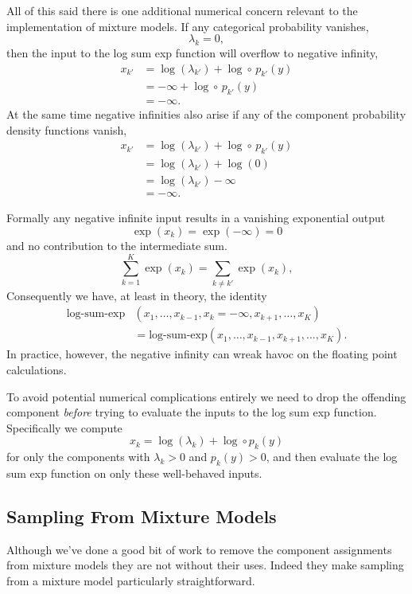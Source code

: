 \documentclass[
  letterpaper,
  DIV=11,
  numbers=noendperiod]{scrartcl}
\begin{document}
All of this said there is one additional numerical concern relevant to
the implementation of mixture models. If any categorical probability
vanishes, \[
\lambda_{k} = 0,
\] then the input to the log sum exp function will overflow to negative
infinity, \begin{align*}
x_{k'}
&=
\log(\lambda_{k'}) + \log \circ \, p_{k'}(y)
\\
&=
-\infty + \log \circ \, p_{k'}(y)
\\
&=
-\infty.
\end{align*} At the same time negative infinities also arise if any of
the component probability density functions vanish, \begin{align*}
x_{k'}
&=
\log(\lambda_{k'}) + \log \circ \, p_{k'}(y)
\\
&=
\log(\lambda_{k'}) + \log(0)
\\
&=
\log(\lambda_{k'}) -\infty
\\
&=
-\infty.
\end{align*}

Formally any negative infinite input results in a vanishing exponential
output \[
\exp(x_{k}) = \exp(-\infty) = 0
\] and no contribution to the intermediate sum. \[
\sum_{k = 1}^{K} \exp(x_{k}) = \sum_{k \ne k'} \exp (x_{k}),
\] Consequently we have, at least in theory, the identity \begin{align*}
\text{log-sum-exp}&(x_{1}, \ldots, x_{k - 1}, x_{k} = -\infty,
                     x_{k + 1}, \ldots, x_{K})
\\
&=
\text{log-sum-exp}(x_{1}, \ldots, x_{k - 1},
                     x_{k + 1}, \ldots, x_{K}).
\end{align*} In practice, however, the negative infinity can wreak havoc
on the floating point calculations.

To avoid potential numerical complications entirely we need to drop the
offending component \emph{before} trying to evaluate the inputs to the
log sum exp function. Specifically we compute \[
x_{k} = \log(\lambda_{k}) + \log \circ p_{k}(y)
\] for only the components with \(\lambda_{k} > 0\) and
\(p_{k}(y) > 0\), and then evaluate the log sum exp function on only
these well-behaved inputs.

\subsection{Sampling From Mixture Models}\label{sec:sampling}

Although we've done a good bit of work to remove the component
assignments from mixture models they are not without their uses. Indeed
they make sampling from a mixture model particularly straightforward.
\end{document}
